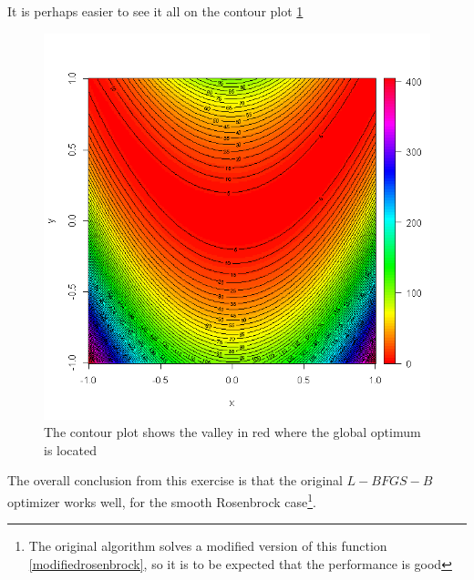 It is perhaps easier to see it all on the contour plot \ref{contourbanana}

\begin{figure}
\begin{center}
\includegraphics[scale=0.5]{Figures/contour.PNG}
\caption[Contour Plot of the Original Rosenbrock Function]{The contour plot shows the valley in red where the global optimum is located}
\label{contourbanana}
\end{center}
\end{figure}

The overall conclusion from this exercise is that the original $L-BFGS-B$ optimizer works well, for the smooth Rosenbrock case\footnote{The original algorithm solves a modified version of this function \ref{modifiedrosenbrock}, so it is to be expected that the performance is good}.

